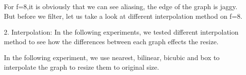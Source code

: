 \documentclass[12pt,a4paper]{article}
\begin{document}
\begin{figure}[H]
\end{figure}
For f=8,it is obviously that we can see aliasing, the edge of the graph is jaggy.
But before we filter, let us take a look at different interpolation method on f=8.\par
2. Interpolation: In the following experiments, we tested different interpolation method to see 
how the differences between each graph effects the resize.\par
In the following experiment, we use nearest, bilinear, bicubic and box to interpolate the graph
to resize them to original size.

\clearpage
\end{document}
